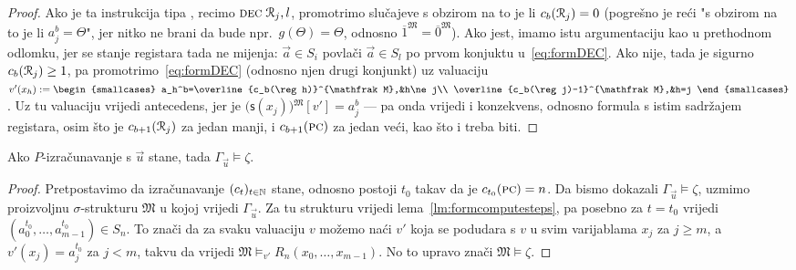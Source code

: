 \begin{proof}
	Ako je ta instrukcija tipa \dec, recimo $\textsc{dec}\;\mathcal R_{j},l$, promotrimo slučajeve s obzirom na to je li $c_b(\mathcal R_{j})=0$ (pogrešno je reći "s obzirom na to je li $a_j^b=\Theta$", jer nitko ne brani da bude npr.\ $g(\Theta)=\Theta$, odnosno $\overline1^{\mathfrak M}=\overline0^{\mathfrak M}$). Ako jest, imamo istu argumentaciju kao u prethodnom odlomku, jer se stanje registara tada ne mijenja: $\vec a\in S_i$ povlači $\vec a\in S_l$ po prvom konjuktu u~\eqref{eq:formDEC}. Ako nije, tada je sigurno $c_b(\mathcal R_{j})\ge1$, pa promotrimo~\eqref{eq:formDEC} (odnosno njen drugi konjunkt) uz valuaciju
$v'(x_h):=\begin{smallcases}
	a_h^b=\overline{c_b(\reg h)}^{\mathfrak M},&h\ne j\\
	\overline{c_b(\reg j)-1}^{\mathfrak M},&h=j
\end{smallcases}$.
	Uz tu valuaciju vrijedi antecedens, jer je $\bigl(\mathsf s(x_j)\bigr){}^{\mathfrak M}[v']=a_j^b$ --- pa onda vrijedi i konzekvens, odnosno formula s istim sadržajem registara, osim što je $c_{b+1}(\mathcal R_{j})$ za jedan manji, i $c_{b+1}(\textsc{pc})$ za jedan veći, kao što i treba biti.
\end{proof}

\begin{propozicija}[{name=[zaustavljanje povlači zaključivanje]}]\label{pp:stop>models}
Ako $P$-izračunavanje s $\vec u$ stane, tada $\Gamma_{\vec u}\models\zeta$.
\end{propozicija}
\begin{proof}
	Pretpostavimo da izračunavanje $(c_t)_{t\in{\mathbb N}}$ stane, odnosno postoji $t_0$ takav da je $c_{t_0}(\textsc{pc})=n$. Da bismo dokazali $\Gamma_{\vec u}\models\zeta$, uzmimo proizvoljnu $\sigma$-strukturu $\mathfrak M$ u kojoj vrijedi $\Gamma_{\vec u}$. Za tu strukturu vrijedi lema~\ref{lm:formcomputesteps}, pa posebno za $t=t_0$ vrijedi $(a_0^{t_0},\dotsc,a_{m-1}^{t_0})\in S_n$. To znači da za svaku valuaciju $v$ možemo naći $v'$ koja se podudara s $v$ u svim varijablama $x_j$ za $j\ge m$, a $v'(x_j)=a_j^{t_0}$ za $j<m$, takvu da vrijedi $\mathfrak M\models_{v'}R_n(x_0,\dotsc,x_{m-1})$. No to upravo znači $\mathfrak M\models\zeta$.
\end{proof}


